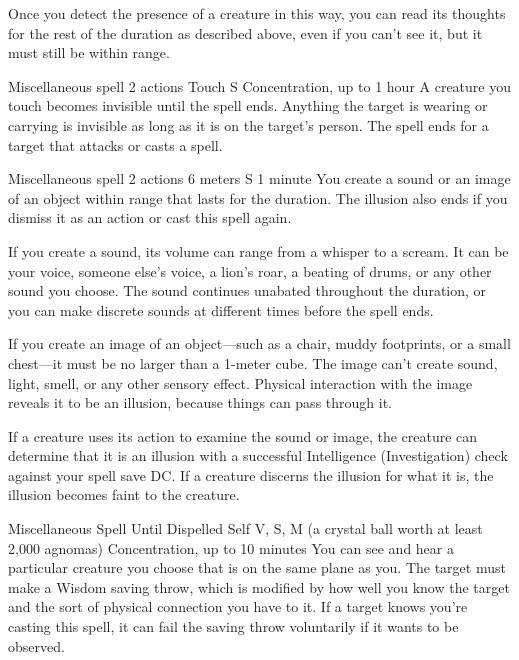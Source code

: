     Once you detect the presence of a creature in this way, you can read its thoughts for the rest of the duration as described above, even if you can't see it, but it must still be within range.

    {Miscellaneous spell}
    {2 actions}
    {Touch}
    {S}
    {Concentration, up to 1 hour}
    A creature you touch becomes invisible until the spell ends.
    Anything the target is wearing or carrying is invisible as long as it is on the target's person.
    The spell ends for a target that attacks or casts a spell.

    {Miscellaneous spell}
    {2 actions}
    {6 meters}
    {S}
    {1 minute}
    You create a sound or an image of an object within range that lasts for the duration.
    The illusion also ends if you dismiss it as an action or cast this spell again.

    If you create a sound, its volume can range from a whisper to a scream.
    It can be your voice, someone else's voice, a lion's roar, a beating of drums, or any other sound you choose.
    The sound continues unabated throughout the duration, or you can make discrete sounds at different times before the spell ends.

    If you create an image of an object---such as a chair, muddy footprints, or a small chest---it must be no larger than a 1-meter cube.
    The image can't create sound, light, smell, or any other sensory effect.
    Physical interaction with the image reveals it to be an illusion, because things can pass through it.

    If a creature uses its action to examine the sound or image, the creature can determine that it is an illusion with a successful Intelligence (Investigation) check against your spell save DC.
    If a creature discerns the illusion for what it is, the illusion becomes faint to the creature.

    {Miscellaneous Spell}
    {Until Dispelled}
    {Self}
    {V, S, M (a crystal ball worth at least 2,000 agnomas)}
    {Concentration, up to 10 minutes}
    You can see and hear a particular creature you choose that is on the same plane as you.
    The target must make a Wisdom saving throw, which is modified by how well you know the target and the sort of physical connection you have to it.
    If a target knows you're casting this spell, it can fail the saving throw voluntarily if it wants to be observed.

